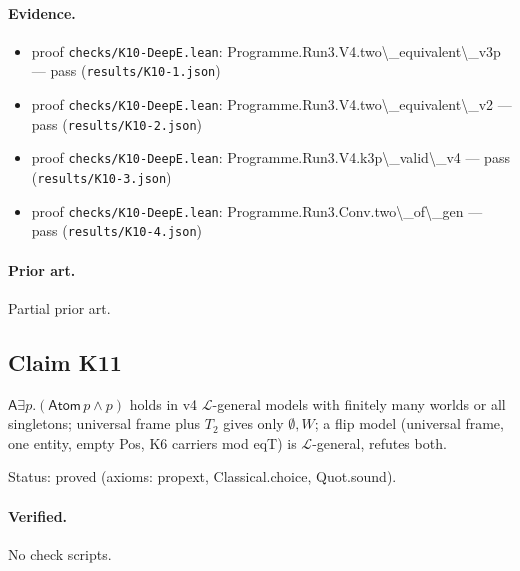 \documentclass{article}
\begin{document}
\paragraph{Evidence.}
\begin{itemize}
\item proof \texttt{checks/K10-DeepE.lean}: Programme.Run3.V4.two\textbackslash{}\_equivalent\textbackslash{}\_v3p --- pass (\texttt{results/K10-1.json})
\item proof \texttt{checks/K10-DeepE.lean}: Programme.Run3.V4.two\textbackslash{}\_equivalent\textbackslash{}\_v2 --- pass (\texttt{results/K10-2.json})
\item proof \texttt{checks/K10-DeepE.lean}: Programme.Run3.V4.k3p\textbackslash{}\_valid\textbackslash{}\_v4 --- pass (\texttt{results/K10-3.json})
\item proof \texttt{checks/K10-DeepE.lean}: Programme.Run3.Conv.two\textbackslash{}\_of\textbackslash{}\_gen --- pass (\texttt{results/K10-4.json})
\end{itemize}

\paragraph{Prior art.} Partial prior art.

\subsection*{Claim K11}

$\mathsf A\exists p.(\mathsf{Atom}\,p\wedge p)$ holds in v4 $\mathcal L$-general models with finitely many worlds or all singletons; universal frame plus $T_2$ gives only $\emptyset,W$; a flip model (universal frame, one entity, empty Pos, K6 carriers mod eqT) is $\mathcal L$-general, refutes both.

Status: proved (axioms: propext, Classical.choice, Quot.sound).

\paragraph{Verified.}
No check scripts.
\end{document}
